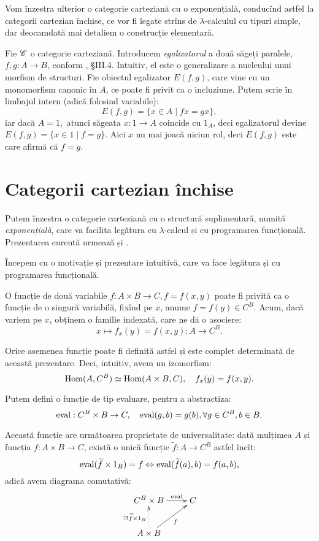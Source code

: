 \documentclass[a4paper]{article}
\begin{document}
Vom înzestra ulterior o categorie carteziană cu o exponențială,
conducînd astfel la categorii cartezian închise, ce vor fi legate
strîns de $ \lambda $-calculul cu tipuri simple, dar deocamdată
mai detaliem o construcție elementară.

Fie $ \mathscr{C} $ o categorie carteziană. Introducem \emph{egalizatorul}
a două săgeți paralele, $ f, g : A \to B $, conform \cite{macc}, \S III.4.
Intuitiv, el este o generalizare a nucleului unui morfism de structuri.
Fie obiectul egalizator $ E(f, g) $, care vine cu un monomorfism canonic
în $ A $, ce poate fi privit ca o incluziune. Putem scrie în limbajul
intern (adică folosind variabile):
\[
  E(f, g) = \{ x \in A \mid fx = gx \},
\]
iar dacă $ A = 1, $ atunci săgeata $ x : 1 \to A $ coincide cu $ 1_A $, 
deci egalizatorul devine $ E(f, g) = \{ x \in 1 \mid f = g \} $. 
Aici $ x $ nu mai joacă niciun rol, deci $ E(f, g) $ este  care
afirmă că $ f = g $.

\section{Categorii cartezian închise}

\indent\indent Putem înzestra o categorie carteziană cu o structură
suplimentară, numită \emph{exponențială}, care va facilita legătura cu
$\lambda$-calcul și cu programarea funcțională. Prezentarea curentă urmează
\cite{awodey} și \cite{mact}.

Începem cu o motivație și prezentare intuitivă, care va face legătura
și cu programarea funcțională.

O funcție de două variabile $ f : A \times B \to C, f = f(x, y) $ poate
fi privită ca o funcție de o singură variabilă, fixînd pe $ x $,
anume $ f = f(y) \in C^B $. Acum, dacă variem pe $ x $, obținem o 
familie indexată, care ne dă o asociere:
\[
  x \mapsto f_x(y) = f(x, y) : A \to C^B.
\]

Orice asemenea funcție poate fi definită astfel și este complet determinată
de această prezentare. Deci, intuitiv, avem un izomorfism:
\[
  \mathrm{Hom}(A, C^B) \simeq \mathrm{Hom}(A \times B, C), \quad f_x(y) = f(x, y).
\]

Putem defini o funcție de tip evaluare, pentru a abstractiza:
\[
  \dr{eval} : C^B \times B \to C, \quad %
  \dr{eval}(g, b) = g(b), \forall g \in C^B, b \in B.
\]

Această funcție are următoarea proprietate de universalitate: dată mulțimea
$ A $ și funcția $ f : A \times B \to C $, există o unică funcție
$ \widetilde{f} : A \to C^B $ astfel încît:
\[
  \dr{eval}(\widetilde{f} \times 1_B) = f \Leftrightarrow %
  \dr{eval}(\widetilde{f}(a), b) = f(a, b),
\]
adică avem diagrama comutativă:
\[
  \xymatrix{
  C^B \times B \ar[r]^-{\dr{eval}} & C \\
  A \times B \ar@{.>}[u]^{\exists! \widetilde{f} \times 1_B} \ar[ur]_-f &
}
\]
\end{document}
